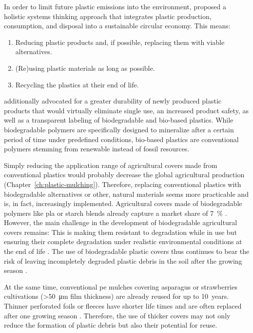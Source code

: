 In order to limit future plastic emissions into the environment, \citet{ThompsonPlastics2009,ScalengheResource2018,RhodesPlastic2018} proposed a holistic systems thinking approach that integrates plastic production, consumption, and disposal into a sustainable circular economy. This means:

\begin{enumerate}
	\item Reducing plastic products and, if possible, replacing them with viable alternatives.
	\item (Re)using plastic materials as long as possible.
	\item Recycling the plastics at their end of life.
\end{enumerate}

 additionally advocated for a greater durability of newly produced plastic products that would virtually eliminate single use, an increased product safety, as well as a transparent labeling of biodegradable and bio-based plastics. While biodegradable polymers are specifically designed to mineralize after a certain period of time under predefined conditions, bio-based plastics are conventional polymers stemming from renewable instead of fossil resources.

Simply reducing the application range of agricultural covers made from conventional plastics would probably decrease the global agricultural production (Chapter~\ref{ch:plastic-mulching}). Therefore, replacing conventional plastics with biodegradable alternatives or other, natural materials seems more practicable \citep{BrandesMikro2020} and is, in fact, increasingly implemented. Agricultural covers made of biodegradable polymers like \ac{pla} or starch blends already capture a market share of \SI{7}{\percent} \citep{BertlingKunststoffe2021}. However, the main challenge in the development of biodegradable agricultural covers remains: This is making them resistant to degradation while in use but ensuring their complete degradation under realistic environmental conditions at the end of life \citep[Chapter~\ref{ch:plastic-mulching};][]{BertlingKunststoffe2021}. The use of biodegradable plastic covers thus continues to bear the risk of leaving incompletely degraded plastic debris in the soil after the growing season \citep{SanderBiodegradation2019,VieraAre2021}.

At the same time, conventional \ac{pe} mulches covering asparagus or strawberries cultivations (\SI{>50}{\micro\meter} film thickness) are already reused for up to \num{10}~years. Thinner perforated foils or fleeces have shorter life times and are often replaced after one growing season \citep[Chapter~\ref{ch:screening};][]{BertlingKunststoffe2021}. Therefore, the use of thicker covers may not only reduce the formation of plastic debris but also their potential for reuse.

